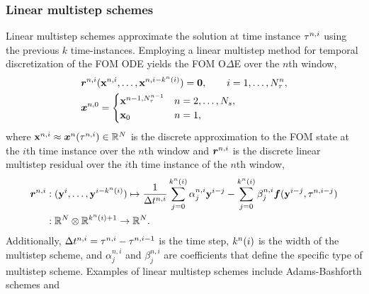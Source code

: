 \subsubsection{Linear multistep schemes}
Linear multistep schemes approximate the solution at time instance $\tau^{n,i}$ using the previous $k$ time-instances.  
Employing a linear multistep method for temporal discretization of the FOM ODE yields the FOM O$\Delta$E over the $n$th window,
\begin{align*}
&\boldsymbol r_{}^{n,i} ({\mathbf{x}}^{n,i},\ldots,{\mathbf{x}}^{n,i-k^n(i)}) = \boldsymbol 0, \qquad i=1,\ldots,N_{\tau}^{n}, \\
&\boldsymbol x^{n,0} = \begin{cases}
{\mathbf{x}}^{n-1,N_{\tau}^{n-1}} & n = 2,\ldots,N_s, \\
{{\mathbf{x}}_0} & n=1, \end{cases}
\end{align*}
where ${\mathbf{x}}^{n,i} \approx {\boldsymbol x}^{n}(\tau^{n,i}) \in \mathbb{R}^{N}$ is the discrete approximation to the FOM state at the $i$th time instance over the $n$th window and $\boldsymbol r_{}^{n,i}$ is the discrete linear multistep residual over the $i$th time instance of the $n$th window,
\begin{align*}
\boldsymbol r^{n,i} &: (\mathbf{y}^{i},\ldots,\mathbf{y}^{i-k^{n}(i)}) \mapsto  \frac{1}{\Delta t^{n,i}} \sum_{j=0}^{k^{n}(i)} \alpha^{n,i}_j \mathbf{y}^{i-j} -  \sum_{j=0}^{k^{n}(i)} \beta^{n,i}_j \boldsymbol f(\mathbf{y}^{i-j},\tau^{n,i-j}) \\
               &: \mathbb{R}^{N} \otimes \mathbb{R}^{k^{n}(i)+1} \rightarrow \mathbb{R}^{N}. 
\end{align*} 
Additionally, $\Delta t^{n,i} = \tau^{n,i} - \tau^{n,i-1}$ is the time step, $k^{n}(i)$ is the width of the multistep scheme, and $\alpha^{n,i}_j$ and $\beta^{n,i}_j$ are coefficients that 
define the specific type of multistep scheme. Examples of linear multistep schemes include Adams-Bashforth schemes and  
